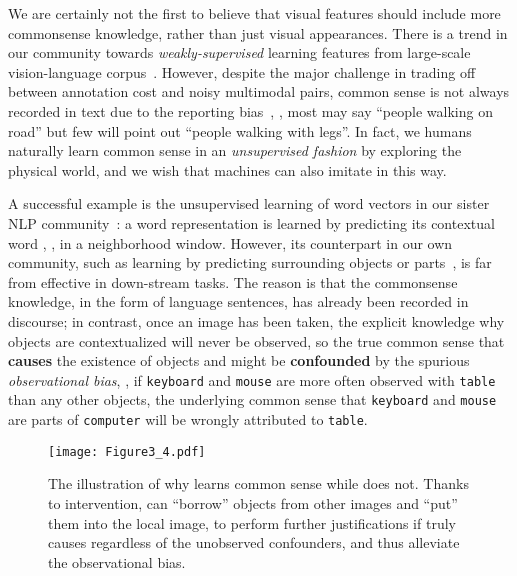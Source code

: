 \documentclass[10pt,twocolumn,letterpaper]{article}
\begin{document}
We are certainly not the first to believe that visual features should include more commonsense knowledge, rather than just visual appearances. There is a trend in our community towards \emph{weakly-supervised} learning features from large-scale vision-language corpus~\cite{lu2019vilbert,sun2019videobert,tan2019lxmert}. However, despite the major challenge in trading off between annotation cost and noisy multimodal pairs, common sense is not always recorded in text due to the reporting bias~\cite{vedantam2015learning,lin2015don}, \eg, most may say ``people walking on road'' but few will point out ``people walking with legs''. In fact, we humans naturally learn common sense in an \emph{unsupervised fashion} by exploring the physical world, and we wish that machines can also imitate in this way.

A successful example is the unsupervised learning of word vectors in our sister NLP community~\cite{mikolov2013distributed, devlin2018bert, peters2018deep}: a word representation  is learned by predicting its contextual word , \ie,  in a neighborhood window. However, its counterpart in our own community, such as learning by predicting surrounding objects or parts~\cite{doersch2015unsupervised,malisiewicz2009beyond}, is far from effective in down-stream tasks. The reason is that the commonsense knowledge, in the form of language sentences, has already been recorded in discourse; in contrast, once an image has been taken, the explicit knowledge why objects are contextualized will never be observed, so the true common sense that \textbf{causes} the existence of objects  and  might be \textbf{confounded} by the spurious \emph{observational bias}, \eg, if \texttt{keyboard} and \texttt{mouse} are more often observed with \texttt{table} than any other objects, the underlying common sense that \texttt{keyboard} and \texttt{mouse} are parts of \texttt{computer} will be wrongly attributed to \texttt{table}. 

\begin{figure}[t]
\begin{center}
\texttt{[image: Figure3\_4.pdf]}
\end{center}
\vspace{-0.2cm}
  \caption{The illustration of why   learns common sense while  does not. 
  Thanks to intervention,  can ``borrow'' objects from other images and ``put'' them into the local image, to perform further justifications if  truly causes  regardless of the unobserved confounders, and thus alleviate the observational bias.
  }
\label{fig:figure2}
\vspace{-0.4cm}
\end{figure}
\end{document}
